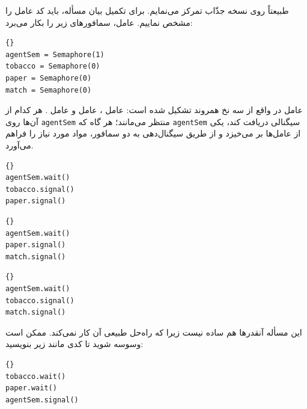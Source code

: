 \documentclass{book}
\begin{document}
    طبیعتاً روی نسخه جذّاب تمرکز می‌نمایم. برای تکمیل بیان مسأله، باید کد عامل را مشخص نماییم. عامل، سمافورهای زیر را بکار می‌برد:

\begin{latin}
\begin{lstlisting}[title=\rl{سمافورهای عامل}]{}
agentSem = Semaphore(1)
tobacco = Semaphore(0)
paper = Semaphore(0)
match = Semaphore(0)
\end{lstlisting}
\end{latin}

    عامل در واقع از سه نخ همروند تشکیل شده است:  عامل ،  عامل  و عامل .
    هر کدام از آن‌ها روی {\tt agentSem} منتظر می‌مانند؛ هر گاه که {\tt agentSem} سیگنالی دریافت کند، یکی از عامل‌ها بر می‌خیزد و 
    از طریق سیگنال‌دهی به دو سمافور، مواد مورد نیاز را فراهم می‌آورد. 

\begin{latin}
\begin{lstlisting}[title=\rl{کد عامل \lr{A}}]{}
agentSem.wait()
tobacco.signal()
paper.signal()
\end{lstlisting}
\end{latin}


\begin{latin}
\begin{lstlisting}[title=\rl{کد عامل \lr{B}}]{}
agentSem.wait()
paper.signal()
match.signal()
\end{lstlisting}
\end{latin}

\begin{latin}
\begin{lstlisting}[title=\rl{کد عامل \lr{C}}]{}
agentSem.wait()
tobacco.signal()
match.signal()
\end{lstlisting}
\end{latin}

    این مسأله آنقدرها هم ساده نیست زیرا که راه‌حل طبیعی آن کار نمی‌کند.  ممکن است وسوسه شوید تا کدی مانند زیر بنویسید:
    

\begin{latin}
\begin{lstlisting}[title=\rl{‌سیگاری کبریت‌دار}]{}
tobacco.wait()
paper.wait()
agentSem.signal()
\end{lstlisting}
\end{latin}
\end{document}

